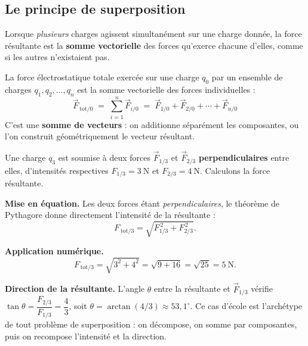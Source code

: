 \documentclass[11pt,a4paper]{article}
\newcommand{\vc}[1]{\vec{#1}}
\newcommand{\F}[2]{\vc{F}_{#1/#2}}     %
\begin{document}
\subsection{Le principe de superposition}

Lorsque \emph{plusieurs} charges agissent simultanément sur une charge donnée, la force résultante
est la \textbf{somme vectorielle} des forces qu'exerce chacune d'elles, comme si les autres
n'existaient pas.

\begin{theoreme}
La force électrostatique totale exercée sur une charge $q_0$ par un ensemble de charges
$q_1, q_2, \dots, q_n$ est la somme vectorielle des forces individuelles :
\[ \boxed{\;\vc{F}_{\,\text{tot}/0} \;=\; \sum_{i=1}^{n}\F{i}{0}
      \;=\; \F{1}{0} + \F{2}{0} + \cdots + \F{n}{0}\;} \]
C'est une \textbf{somme de vecteurs} : on additionne séparément les composantes, ou l'on construit
géométriquement le vecteur résultant.
\end{theoreme}

\begin{exemple}
Une charge $q_3$ est soumise à deux forces $\F{1}{3}$ et $\F{2}{3}$ \textbf{perpendiculaires} entre
elles, d'intensités respectives $F_{1/3} = \SI{3}{\newton}$ et $F_{2/3} = \SI{4}{\newton}$.
Calculons la force résultante.

\smallskip
\begin{center}
\end{center}

\textbf{Mise en équation.} Les deux forces étant \emph{perpendiculaires}, le théorème de
Pythagore donne directement l'intensité de la résultante :
\[ F_{\,\text{tot}/3} = \sqrt{F_{1/3}^{\,2} + F_{2/3}^{\,2}}. \]

\textbf{Application numérique.}
\[ F_{\,\text{tot}/3} = \sqrt{3^2 + 4^2} = \sqrt{9 + 16} = \sqrt{25} = \SI{5}{\newton}. \]

\textbf{Direction de la résultante.} L'angle $\theta$ entre la résultante et $\F{1}{3}$ vérifie
$\tan\theta = \dfrac{F_{2/3}}{F_{1/3}} = \dfrac{4}{3}$, soit $\theta = \arctan(4/3) \approx
53{,}1^\circ$. Ce cas d'école est l'archétype de tout problème de superposition : on décompose,
on somme par composantes, puis on recompose l'intensité et la direction.
\end{exemple}
\end{document}
